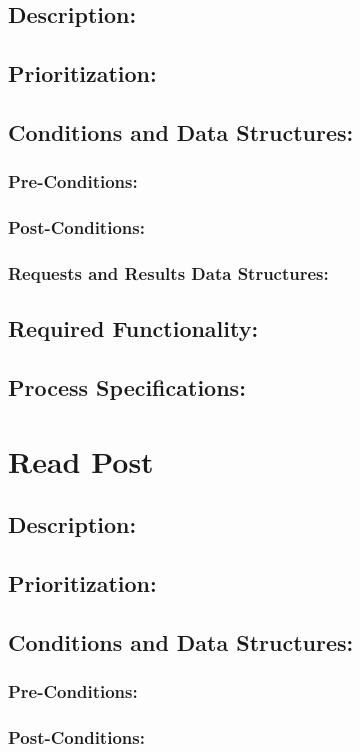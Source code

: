 \documentclass[a4paper,11pt]{article}
\begin{document}
\subsection*{Description:}
\subsection{Prioritization:} 
\subsection{Conditions and Data Structures:}
\subsubsection*{Pre-Conditions:}
\subsubsection*{Post-Conditions:}
\subsubsection*{Requests and Results Data Structures:}
\subsection{Required Functionality:} 
\subsection{Process Specifications:} 

\section{Read Post}
\subsection*{Description:}
\subsection{Prioritization:} 
\subsection{Conditions and Data Structures:}
\subsubsection*{Pre-Conditions:}
\subsubsection*{Post-Conditions:}
\end{document}
